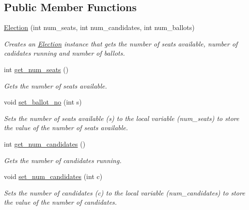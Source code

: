 \subsection*{Public Member Functions}
\begin{DoxyCompactItemize}
\item 
\mbox{\hyperlink{class_election_af15999d79dbd51ad41380207a2fb0ba4}{Election}} (int num\+\_\+seats, int num\+\_\+candidates, int num\+\_\+ballots)
\begin{DoxyCompactList}\small\item\em Creates an \mbox{\hyperlink{class_election}{Election}} instance that gets the number of seats available, number of cadidates running and number of ballots. \end{DoxyCompactList}\item 
\mbox{\label{class_election_a9582c81b6b89805f531197efb0e34db8}} 
int \mbox{\hyperlink{class_election_a9582c81b6b89805f531197efb0e34db8}{get\+\_\+num\+\_\+seats}} ()
\begin{DoxyCompactList}\small\item\em Gets the number of seats available. \end{DoxyCompactList}\item 
void \mbox{\hyperlink{class_election_ad39320c11e6c6d5c95dc6128a2dd0a07}{set\+\_\+ballot\+\_\+no}} (int s)
\begin{DoxyCompactList}\small\item\em Sets the number of seats available (s) to the local variable (num\+\_\+seats) to store the value of the number of seats available. \end{DoxyCompactList}\item 
\mbox{\label{class_election_aabeb70eb7aae4e60c6173b71e4218d96}} 
int \mbox{\hyperlink{class_election_aabeb70eb7aae4e60c6173b71e4218d96}{get\+\_\+num\+\_\+candidates}} ()
\begin{DoxyCompactList}\small\item\em Gets the number of candidates running. \end{DoxyCompactList}\item 
void \mbox{\hyperlink{class_election_ad73c41e88247a694c44370b4d28c04d0}{set\+\_\+num\+\_\+candidates}} (int c)
\begin{DoxyCompactList}\small\item\em Sets the number of candidates (c) to the local variable (num\+\_\+candidates) to store the value of the number of candidates. \end{DoxyCompactList}\item 

\end{DoxyCompactItemize}

